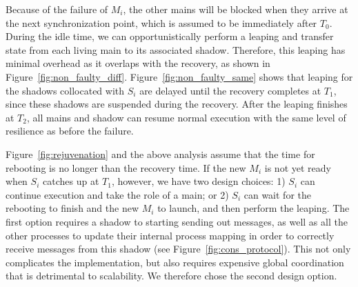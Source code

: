 Because of the failure of $M_i$, the other mains will be blocked when they arrive at the next synchronization point, which is assumed to be immediately after $T_0$. During the idle time, we can opportunistically perform a leaping and transfer state from each living main to its associated shadow. Therefore, this leaping has minimal overhead as it overlaps with the recovery, as shown in Figure~\ref{fig:non_faulty_diff}. Figure~\ref{fig:non_faulty_same} shows that leaping for the shadows collocated with $S_i$ are delayed until the recovery completes at $T_1$, since these shadows are suspended during the recovery. After the leaping finishes at $T_2$, all mains and shadow can resume normal execution with the same level of resilience as before the failure.

Figure~\ref{fig:rejuvenation} and the above analysis assume that the time for rebooting is no longer than the recovery time. If the new $M_i$ is not yet ready when $S_i$ catches up at $T_1$, however, we have two design choices: 1) $S_i$ can continue execution and take the role of a main; or 2) $S_i$ can wait for the rebooting to finish and the new $M_i$ to launch, and then perform the leaping.  The first option requires a shadow to starting sending out messages, as well as all the other processes to update their internal process mapping in order to correctly receive messages from this shadow (see Figure~\ref{fig:cons_protocol}). This not only complicates the implementation, but also requires expensive global coordination that is detrimental to scalability. We therefore chose the second design option.



